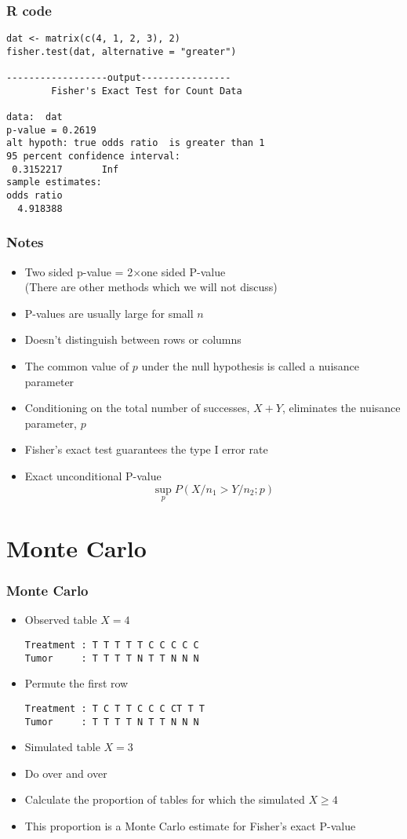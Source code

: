 \documentclass[aspectratio=169]{beamer}
\begin{document}
\begin{frame}[fragile]\frametitle{R code}
\begin{verbatim}
dat <- matrix(c(4, 1, 2, 3), 2)
fisher.test(dat, alternative = "greater")

------------------output----------------
        Fisher's Exact Test for Count Data

data:  dat 
p-value = 0.2619
alt hypoth: true odds ratio  is greater than 1 
95 percent confidence interval:
 0.3152217       Inf 
sample estimates:
odds ratio 
  4.918388 
\end{verbatim}
\end{frame}

\begin{frame}\frametitle{Notes}
\begin{itemize}
\item Two sided p-value = 2$\times$one sided P-value \\
  (There are other methods which we will not discuss)
\item P-values are usually large for small $n$ 
\item Doesn't distinguish between rows or columns 
\item The common value of $p$ under the null hypothesis
  is called a nuisance parameter
\item Conditioning on the total number of successes, $X + Y$, eliminates
  the nuisance parameter, $p$
\item Fisher's exact test guarantees the type I error rate
\item Exact unconditional P-value
$$
\sup_p P(X/n_1 > Y/n_2; p)
$$
\end{itemize}
\end{frame}

\section{Monte Carlo}
\begin{frame}[fragile]\frametitle{Monte Carlo}
\begin{itemize}
\item Observed table $X = 4$
\begin{verbatim} 
Treatment : T T T T T C C C C C         
Tumor     : T T T T N T T N N N 
\end{verbatim}
\item Permute the first row
\begin{verbatim}
Treatment : T C T T C C C CT T T     
Tumor     : T T T T N T T N N N
\end{verbatim}
\item Simulated table $X = 3$ 
\item Do over and over 
\item Calculate the proportion of tables for 
which the simulated $X \geq 4$ 
\item This proportion is a Monte Carlo estimate
for Fisher's exact P-value
\end{itemize}
\end{frame}
\end{document}
